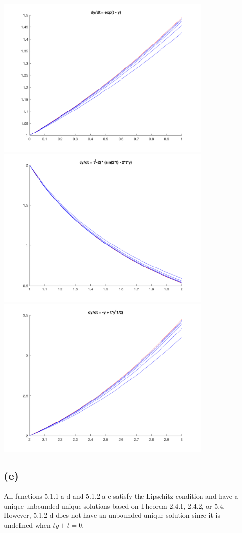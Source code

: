 \documentclass{article}
\begin{document}
\includegraphics[height=8cm]{partc_5}\\
\includegraphics[height=8cm]{partc_6}\\
\includegraphics[height=8cm]{partc_7}\\

\subsection*{(e)}
All functions 5.1.1 a-d and 5.1.2 a-c satisfy the Lipschitz condition and have a unique unbounded unique solutions based on Theorem 2.4.1, 2.4.2, or 5.4. However, 5.1.2 d does not have an unbounded unique solution since it is undefined when $ty + t = 0$. 
\end{document}
